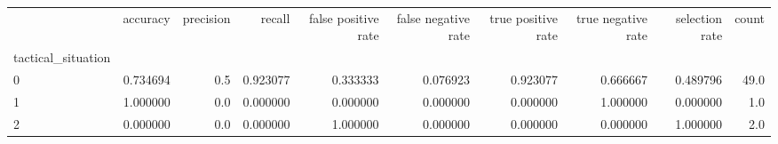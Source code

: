 \begin{tabular}{lrrrrrrrrr}
\toprule
{} &  accuracy &  precision &    recall &  false positive rate &  false negative rate &  true positive rate &  true negative rate &  selection rate &  count \\
tactical\_situation &           &            &           &                      &                      &                     &                     &                 &        \\
\midrule
0                  &  0.734694 &        0.5 &  0.923077 &             0.333333 &             0.076923 &            0.923077 &            0.666667 &        0.489796 &   49.0 \\
1                  &  1.000000 &        0.0 &  0.000000 &             0.000000 &             0.000000 &            0.000000 &            1.000000 &        0.000000 &    1.0 \\
2                  &  0.000000 &        0.0 &  0.000000 &             1.000000 &             0.000000 &            0.000000 &            0.000000 &        1.000000 &    2.0 \\
\bottomrule
\end{tabular}
